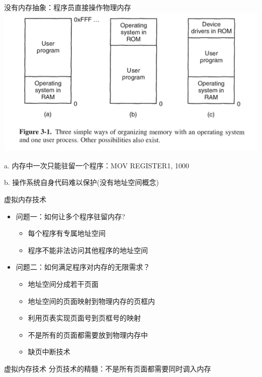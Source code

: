 \documentclass[xcolor=svgnames]{beamer}
\begin{document}
\begin{CJK*}{UTF8}{gbsn}
\begin{frame}{没有内存抽象：程序员直接操作物理内存}
\includegraphics[width=1.0\textwidth]{nomem.png}

a. 内存中一次只能驻留一个程序：\alert{MOV REGISTER1, 1000}

b. 操作系统自身代码难以保护(没有地址空间概念)
\end{frame}

\begin{frame}{虚拟内存技术}
\begin{itemize}
\item 问题一：如何让多个程序驻留内存?
\begin{itemize}
\item 每个程序有专属地址空间
\item 程序不能非法访问其他程序的地址空间
\end{itemize}
\item 问题二：如何满足程序对内存的无限需求？
\begin{itemize}
\item 地址空间分成若干\alert{页面}
\item 地址空间的页面映射到物理内存的\alert{页框}内
\item 利用\alert{页表}实现页面号到页框号的映射
\item 不是所有的页面都需要放到物理内存中
\item 缺页中断技术
\end{itemize}
\end{itemize}
\end{frame}

\begin{frame}{虚拟内存技术}
分页技术的精髓：不是所有页面都需要同时调入内存
\end{frame}


\end{CJK*}
\end{document}
